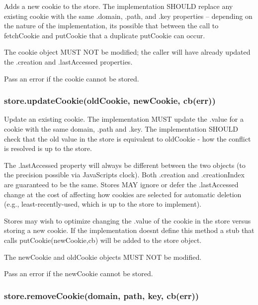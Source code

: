 Adds a new cookie to the store. The implementation S\+H\+O\+U\+LD replace any existing cookie with the same {\ttfamily .domain}, {\ttfamily .path}, and {\ttfamily .key} properties -- depending on the nature of the implementation, it\textquotesingle{}s possible that between the call to {\ttfamily fetch\+Cookie} and {\ttfamily put\+Cookie} that a duplicate {\ttfamily put\+Cookie} can occur.

The {\ttfamily cookie} object M\+U\+ST N\+OT be modified; the caller will have already updated the {\ttfamily .creation} and {\ttfamily .last\+Accessed} properties.

Pass an error if the cookie cannot be stored.

\subsubsection*{{\ttfamily store.\+update\+Cookie(old\+Cookie, new\+Cookie, cb(err))}}

Update an existing cookie. The implementation M\+U\+ST update the {\ttfamily .value} for a cookie with the same {\ttfamily domain}, {\ttfamily .path} and {\ttfamily .key}. The implementation S\+H\+O\+U\+LD check that the old value in the store is equivalent to {\ttfamily old\+Cookie} -\/ how the conflict is resolved is up to the store.

The {\ttfamily .last\+Accessed} property will always be different between the two objects (to the precision possible via Java\+Script\textquotesingle{}s clock). Both {\ttfamily .creation} and {\ttfamily .creation\+Index} are guaranteed to be the same. Stores M\+AY ignore or defer the {\ttfamily .last\+Accessed} change at the cost of affecting how cookies are selected for automatic deletion (e.\+g., least-\/recently-\/used, which is up to the store to implement).

Stores may wish to optimize changing the {\ttfamily .value} of the cookie in the store versus storing a new cookie. If the implementation doesn\textquotesingle{}t define this method a stub that calls {\ttfamily put\+Cookie(new\+Cookie,cb)} will be added to the store object.

The {\ttfamily new\+Cookie} and {\ttfamily old\+Cookie} objects M\+U\+ST N\+OT be modified.

Pass an error if the new\+Cookie cannot be stored.

\subsubsection*{{\ttfamily store.\+remove\+Cookie(domain, path, key, cb(err))}}

